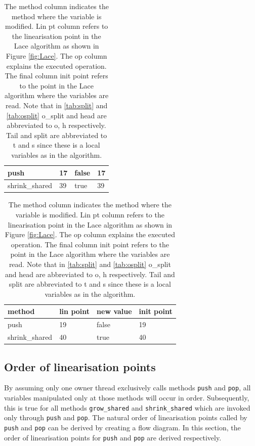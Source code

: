 \documentclass{sig-alternate-br}
\begin{document}
\begin{table}[h]
\begin{subtable}[h]{0.45\textwidth}
\begin{tabular}{|l|l|l|l|}
			push            & 17                 & false       & 17                  \\ \hline
			shrink\_shared  & 39                 & true        & 39               \\ \hline
		\end{tabular}
		\caption{Linearisation points of allstolen variable}
		\label{tab:allst}
	\end{subtable}
	\begin{subtable}[h]{0.45\textwidth}
		\centering
		\begin{tabular}{|l|l|l|l|}
			\hline
			\textbf{method} & \textbf{lin point} & \textbf{new value} & \textbf{init point} \\ \hline
			push            & 19                 & false       & 19                 \\ \hline
			shrink\_shared  & 40                 & true        & 40            \\ \hline
		\end{tabular}
		\caption{Linearisation points of o\_allstolen variable}
		\label{tab:oallst}
	\end{subtable}
	\caption{The method column indicates the method where the variable is modified. Lin pt column refers to the linearisation point in the Lace algorithm as shown in Figure \ref{fig:Lace}. The op column explains the executed operation. The final column init point refers to the point in the Lace algorithm where the variables are read. Note that in \ref{tab:split} and \ref{tab:osplit} o\_split and head are abbreviated to o, h respectively. Tail and split are abbreviated to t and s since these is a local variables as in the algorithm.}
	\label{tab:linpoints}
\end{table}

\subsection{Order of linearisation points}
By assuming only one owner thread exclusively calls methods \texttt{push} and \texttt{pop}, all variables manipulated only at those methods will occur in order.
Subsequently, this is true for all methods \texttt{grow\_shared} and \texttt{shrink\_shared} which are invoked only through \texttt{push} and \texttt{pop}.
The natural order of linearisation points called by \texttt{push} and \texttt{pop} can be derived by creating a flow diagram.
In this section, the order of linearisation points for \texttt{push} and \texttt{pop} are derived respectively.
\end{document}
